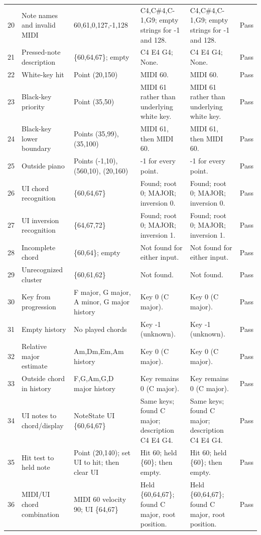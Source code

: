 \documentclass[10pt,letterpaper]{article}
\begin{document}
\begin{landscape}
\begin{longtable}{P{0.6cm}P{3.0cm}P{4.0cm}P{6.8cm}P{6.8cm}P{0.8cm}}
20 & Note names and invalid MIDI & 60,61,0,127,-1,128 & C4,C\#4,C-1,G9; empty strings for -1 and 128. & C4,C\#4,C-1,G9; empty strings for -1 and 128. & Pass \\
21 & Pressed-note description & \{60,64,67\}; empty & C4 E4 G4; None. & C4 E4 G4; None. & Pass \\
22 & White-key hit & Point (20,150) & MIDI 60. & MIDI 60. & Pass \\
23 & Black-key priority & Point (35,50) & MIDI 61 rather than underlying white key. & MIDI 61 rather than underlying white key. & Pass \\
24 & Black-key lower boundary & Points (35,99), (35,100) & MIDI 61, then MIDI 60. & MIDI 61, then MIDI 60. & Pass \\
25 & Outside piano & Points (-1,10), (560,10), (20,160) & -1 for every point. & -1 for every point. & Pass \\
26 & UI chord recognition & \{60,64,67\} & Found; root 0; MAJOR; inversion 0. & Found; root 0; MAJOR; inversion 0. & Pass \\
27 & UI inversion recognition & \{64,67,72\} & Found; root 0; MAJOR; inversion 1. & Found; root 0; MAJOR; inversion 1. & Pass \\
28 & Incomplete chord & \{60,64\}; empty & Not found for either input. & Not found for either input. & Pass \\
29 & Unrecognized cluster & \{60,61,62\} & Not found. & Not found. & Pass \\
30 & Key from progression & F major, G major, A minor, G major history & Key 0 (C major). & Key 0 (C major). & Pass \\
31 & Empty history & No played chords & Key -1 (unknown). & Key -1 (unknown). & Pass \\
32 & Relative major estimate & Am,Dm,Em,Am history & Key 0 (C major). & Key 0 (C major). & Pass \\
33 & Outside chord in history & F,G,Am,G,D major history & Key remains 0 (C major). & Key remains 0 (C major). & Pass \\
34 & UI notes to chord/display & NoteState UI \{60,64,67\} & Same keys; found C major; description C4 E4 G4. & Same keys; found C major; description C4 E4 G4. & Pass \\
35 & Hit test to held note & Point (20,140); set UI to hit; then clear UI & Hit 60; held \{60\}; then empty. & Hit 60; held \{60\}; then empty. & Pass \\
36 & MIDI/UI chord combination & MIDI 60 velocity 90; UI \{64,67\} & Held \{60,64,67\}; found C major, root position. & Held \{60,64,67\}; found C major, root position. & Pass \\

\end{longtable}
\end{landscape}
\end{document}
